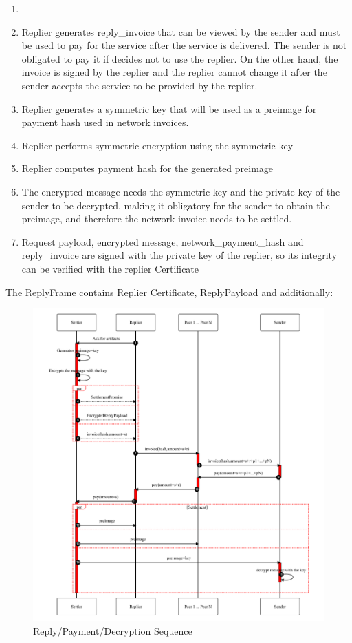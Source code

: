 \documentclass{article}
\begin{document}
\begin{enumerate}
	\item 
	\item Replier generates reply\_invoice that can be viewed by the sender and must be used to pay for the service after the service is delivered. The sender is not obligated to pay it if decides not to use the replier. On the other hand, the invoice is signed by the replier and the replier cannot change it after the sender accepts the service to be provided by the replier.
	\item Replier generates a symmetric key that will be used as a preimage for payment hash used in network invoices.
	\item Replier performs symmetric encryption using the symmetric key
	\item Replier computes payment hash for the generated preimage
	\item The encrypted message needs the symmetric key and the private key of the sender to be decrypted, making it obligatory for the sender to obtain the preimage, and therefore the network invoice needs to be settled.
	\item Request payload, encrypted message, network\_payment\_hash and reply\_invoice are signed with the private key of the replier, so its integrity can be verified with the replier Certificate
\end{enumerate}

The ReplyFrame contains Replier Certificate, ReplyPayload and additionally:

\begin{figure}
	\centering
	\includegraphics[scale=0.8]{ReplyAndPay.pdf}
	\caption{Reply/Payment/Decryption Sequence}
	\label{fig:replyandpay}
\end{figure}
\end{document}
